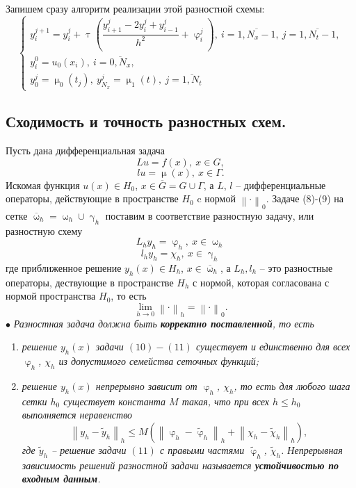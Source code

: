 \documentclass[a4paper, 12pt]{report}
\numberwithin{equation}{section}
\newcommand{\ol}{\overline}
\renewcommand{\leq}{\leqslant}
\renewcommand{\gamma}{\upgamma}
\renewcommand{\varphi}{\upvarphi}
\renewcommand{\tau}{\uptau}
\renewcommand{\mu}{\upmu}
\renewcommand{\omega}{\upomega}
\newcommand\Norm[1]{\left\| #1 \right\|}
\begin{document}
Запишем сразу алгоритм реализации этой разностной схемы:
\begin{equation}
	\begin{cases}
	y_i^{j+1} = y_i^j + \tau \left(\dfrac{y_{i+1}^j - 2y_i^j + y_{i-1}^j}{h^2} + \varphi_i^j\right),\ i=\ol{1, N_x-1},\ j=\ol{1, N_t-1},\\
y_i^0 = u_0(x_i),\ i=\ol{0,N_x},\\
y_0^j = \mu_0(t_j),\ y_{N_x}^j = \mu_1(t),\ j=\ol{1, N_t}
\end{cases}
\end{equation}
\subsection{Сходимость и точность разностных схем.}
Пусть дана дифференциальная задача 
\begin{equation}
	Lu = f(x),\ x \in G,
\end{equation}
\begin{equation}
	lu = \mu(x),\ x \in \Gamma.
\end{equation}
Искомая функция $u(x) \in H_0$, $x \in \ol G = G \cup \Gamma$, а $L$, $l$ -- дифференциальные операторы, действующие в пространстве $H_0$ c нормой $\Norm{\cdot}_0$.
Задаче (8)-(9) на сетке $\ol\omega_h = \omega_h \cup \gamma_h$ поставим в соответствие разностную задачу, или разностную схему
\begin{equation}
	L_h y_h = \varphi_h,\ x \in \omega_h
\end{equation}
\begin{equation}
	l_h y_h = \chi _h,\ x \in \gamma_h
\end{equation}
где приближенное решение $y_h(x) \in H_h$, $x \in \ol\omega_h$, а $L_h, l_h$ -- это разностные операторы, дествующие в пространстве $H_h$ с нормой, которая согласована с нормой пространства $H_0$, то есть
$$\lim\limits_{h \to 0}\Norm{\cdot}_h = \Norm{\cdot}_0.$$
$\bullet$ \textit{Разностная задача должна быть \textbf{корректно поставленной}, то есть}
	\begin{enumerate}
		\item \textit{решение $y_h(x)$ задачи $(10)-(11)$ существует и единственно для всех $\varphi_h$, $\chi_h$ из допустимого семейства сеточных функций;}
		\item \textit{решение $y_h(x)$ непрерывно зависит от $\varphi_h$, $\chi_h$, то есть для любого шага сетки $h_0$ существует константа $M$ такая, что при всех $h \leq h_0$ выполняется неравенство $$\Norm{y_h-\widetilde{y}_h}_h \leq M\left(\Norm{\varphi_h - \widetilde{\varphi}_h}_h + \Norm{\chi_h - \widetilde{\chi}_h}_h\right),$$
		где $\widetilde{y}_h$ -- решение задачи $(11)$ с правыми частями $\widetilde{\varphi}_h$, $\widetilde{\chi}_h$. Непрерывная зависимость решений разностной задачи называется \textbf{устойчивостью по входным данным}.}
	\end{enumerate} 
\end{document}
